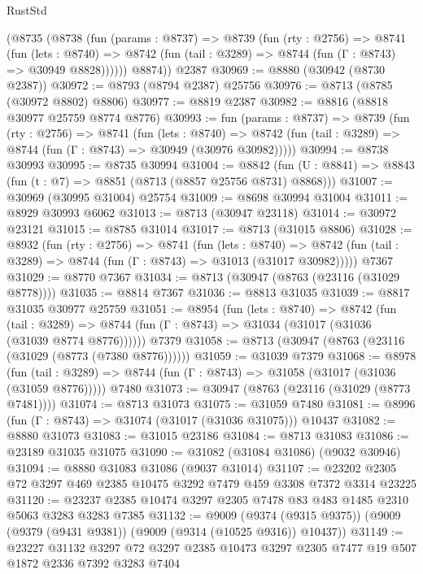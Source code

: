 \begin{lexlean}{RustStd}
\begin{coremodule}
      (@8735
        (@8738
          (fun (params : @8737) =>
          @8739
            (fun (rty : @2756) =>
            @8741
              (fun (lets : @8740) =>
              @8742 (fun (tail : @3289) => @8744 (fun (Γ : @8743) => @30949 @8828))))))
        @8874))
    @2387
@30969 := @8880 (@30942 (@8730 @2387))
@30972 := @8793 (@8794 @2387) @25756
@30976 := @8713 (@8785 (@30972 @8802) @8806)
@30977 := @8819 @2387
@30982 := @8816 (@8818 @30977 @25759 @8774 @8776)
@30993 := fun (params : @8737) =>
  @8739
    (fun (rty : @2756) =>
    @8741
      (fun (lets : @8740) =>
      @8742 (fun (tail : @3289) => @8744 (fun (Γ : @8743) => @30949 (@30976 @30982)))))
@30994 := @8738 @30993
@30995 := @8735 @30994
@31004 := @8842
    (fun (U : @8841) => @8843 (fun (t : @7) => @8851 (@8713 (@8857 @25756 @8731) @8868)))
@31007 := @30969 (@30995 @31004) @25754
@31009 := @8698 @30994 @31004
@31011 := @8929 @30993 @6062
@31013 := @8713 (@30947 @23118)
@31014 := @30972 @23121
@31015 := @8785 @31014
@31017 := @8713 (@31015 @8806)
@31028 := @8932
    (fun (rty : @2756) =>
    @8741
      (fun (lets : @8740) =>
      @8742 (fun (tail : @3289) => @8744 (fun (Γ : @8743) => @31013 (@31017 @30982)))))
    @7367
@31029 := @8770 @7367
@31034 := @8713 (@30947 (@8763 (@23116 (@31029 @8778))))
@31035 := @8814 @7367
@31036 := @8813 @31035
@31039 := @8817 @31035 @30977 @25759
@31051 := @8954
    (fun (lets : @8740) =>
    @8742
      (fun (tail : @3289) =>
      @8744 (fun (Γ : @8743) => @31034 (@31017 (@31036 (@31039 @8774 @8776))))))
    @7379
@31058 := @8713 (@30947 (@8763 (@23116 (@31029 (@8773 (@7380 @8776))))))
@31059 := @31039 @7379
@31068 := @8978
    (fun (tail : @3289) => @8744 (fun (Γ : @8743) => @31058 (@31017 (@31036 (@31059 @8776)))))
    @7480
@31073 := @30947 (@8763 (@23116 (@31029 (@8773 @7481))))
@31074 := @8713 @31073
@31075 := @31059 @7480
@31081 := @8996 (fun (Γ : @8743) => @31074 (@31017 (@31036 @31075))) @10437
@31082 := @8880 @31073
@31083 := @31015 @23186
@31084 := @8713 @31083
@31086 := @23189 @31035 @31075
@31090 := @31082 (@31084 @31086) (@9032 @30946)
@31094 := @8880 @31083 @31086 (@9037 @31014)
@31107 := @23202 @2305 @72 @3297 @469 @2385 @10475 @3292 @7479 @459 @3308 @7372 @3314 @23225
@31120 := @23237 @2385 @10474 @3297 @2305 @7478 @83 @483 @1485 @2310 @5063 @3283 @3283 @7385
@31132 := @9009
    (@9374 (@9315 @9375))
    (@9009 (@9379 (@9431 @9381)) (@9009 (@9314 (@10525 @9316)) @10437))
@31149 := @23227
    @31132
    @3297
    @72
    @3297
    @2385
    @10473
    @3297
    @2305
    @7477
    @19
    @507
    @1872
    @2336
    @7392
    @3283
    @7404

\end{coremodule}
\end{lexlean}
